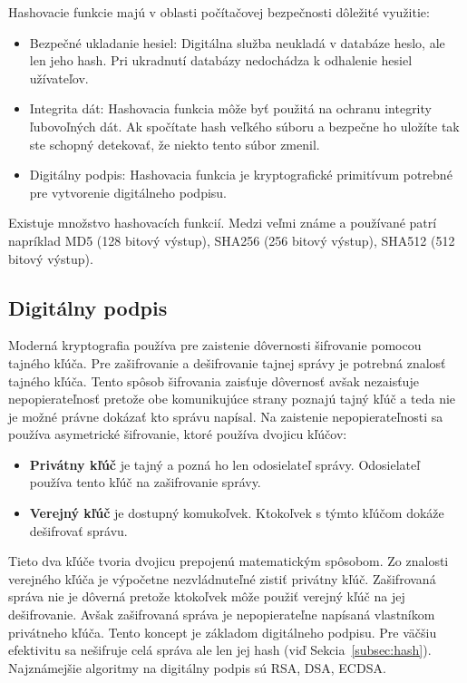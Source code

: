 Hashovacie funkcie majú v oblasti počítačovej bezpečnosti dôležité využitie:
\begin{itemize}
	\item Bezpečné ukladanie hesiel: Digitálna služba neukladá v databáze heslo, ale len jeho hash. Pri ukradnutí databázy nedochádza k odhalenie hesiel užívateľov.
	\item Integrita dát: Hashovacia funkcia môže byť použitá na ochranu integrity ľubovoľných dát. Ak spočítate hash veľkého súboru a bezpečne ho uložíte tak ste schopný detekovať, že niekto tento súbor zmenil.
	\item Digitálny podpis: Hashovacia funkcia je kryptografické primitívum potrebné pre vytvorenie digitálneho podpisu.
\end{itemize}
Existuje množstvo hashovacích funkcií. Medzi veľmi známe a používané patrí napríklad MD5 (128 bitový výstup), SHA256 (256 bitový výstup), SHA512 (512 bitový výstup).~\cite{cryptoHandbook, nigelSmartCrypto}

\subsection{Digitálny podpis}\label{subsec:sign}
Moderná kryptografia používa pre zaistenie dôvernosti šifrovanie pomocou tajného kľúča. Pre zašifrovanie a dešifrovanie tajnej správy je potrebná znalosť tajného kľúča. Tento spôsob šifrovania zaisťuje dôvernosť avšak nezaisťuje nepopierateľnosť pretože obe komunikujúce strany poznajú tajný kľúč a teda nie je možné právne dokázať kto správu napísal. Na zaistenie nepopierateľnosti sa používa asymetrické šifrovanie, ktoré používa dvojicu kľúčov:
\begin{itemize}
	\item \textbf{Privátny kľúč} je tajný a pozná ho len odosielateľ správy. Odosielateľ používa tento kľúč na zašifrovanie správy.
	\item \textbf{Verejný kľúč} je dostupný komukoľvek. Ktokoľvek s týmto kľúčom dokáže dešifrovať správu.
\end{itemize}
Tieto dva kľúče tvoria dvojicu prepojenú matematickým spôsobom. Zo znalosti verejného kľúča je výpočetne nezvládnuteľné zistiť privátny kľúč. Zašifrovaná správa nie je dôverná pretože ktokoľvek môže použiť verejný kľúč na jej dešifrovanie. Avšak zašifrovaná správa je nepopierateľne napísaná vlastníkom privátneho kľúča. Tento koncept je základom digitálneho podpisu. Pre väčšiu efektivitu sa nešifruje celá správa ale len jej hash (viď Sekcia~\ref{subsec:hash}). Najznámejšie algoritmy na digitálny podpis sú RSA, DSA, ECDSA.~\cite{cryptoHandbook}

